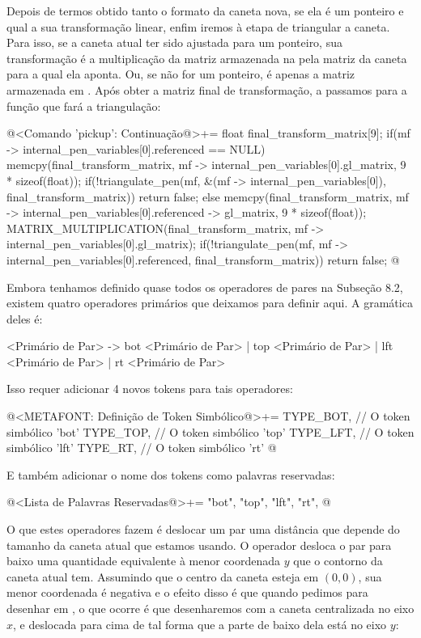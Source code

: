 {Depois de termos obtido tanto o formato da caneta nova, se ela é um
ponteiro e qual a sua transformação linear, enfim iremos à etapa de
triangular a caneta. Para isso, se a caneta atual ter sido ajustada
para um ponteiro, sua transformação é a multiplicação da matriz
armazenada na  pela matriz da caneta para a
qual ela aponta. Ou, se não for um ponteiro, é apenas a matriz
armazenada em . Após obter a matriz final de
transformação, a passamos para a função que fará a triangulação:

\iniciocodigo
@<Comando 'pickup': Continuação@>+=
{
  float final_transform_matrix[9];
  if(mf -> internal_pen_variables[0].referenced == NULL){
    memcpy(final_transform_matrix, mf -> internal_pen_variables[0].gl_matrix,
           9 * sizeof(float));
    if(!triangulate_pen(mf, &(mf -> internal_pen_variables[0]),
                        final_transform_matrix))
      return false;
  }
  else{
    memcpy(final_transform_matrix,
           mf -> internal_pen_variables[0].referenced -> gl_matrix,
           9 * sizeof(float));
    MATRIX_MULTIPLICATION(final_transform_matrix,
                          mf -> internal_pen_variables[0].gl_matrix);
    if(!triangulate_pen(mf, mf -> internal_pen_variables[0].referenced,
                        final_transform_matrix))
      return false;
  }
}
@
\fimcodigo


Embora tenhamos definido quase todos os operadores de pares na
Subseção 8.2, existem quatro operadores primários que deixamos para
definir aqui. A gramática deles é:

\alinhaverbatim
<Primário de Par> -> bot <Primário de Par> | top <Primário de Par> |
                     lft <Primário de Par> | rt <Primário de Par>
\alinhanormal

Isso requer adicionar 4 novos tokens para tais operadores:

\iniciocodigo
@<METAFONT: Definição de Token Simbólico@>+=
TYPE_BOT,  // O token simbólico 'bot'
TYPE_TOP,  // O token simbólico 'top'
TYPE_LFT,  // O token simbólico 'lft'
TYPE_RT,   // O token simbólico 'rt'
@
\fimcodigo

E também adicionar o nome dos tokens como palavras reservadas:

\iniciocodigo
@<Lista de Palavras Reservadas@>+=
"bot", "top", "lft", "rt",
@
\fimcodigo

O que estes operadores fazem é deslocar um par uma distância que
depende do tamanho da caneta atual que estamos usando. O
operador  desloca o par para baixo uma quantidade
equivalente à menor coordenada $y$ que o contorno da caneta atual
tem. Assumindo que o centro da caneta esteja em $(0, 0)$, sua menor
coordenada é negativa e o efeito disso é que quando pedimos para
desenhar em , o que ocorre é que desenharemos
com a caneta centralizada no eixo $x$, e deslocada para cima de tal
forma que a parte de baixo dela está no eixo $y$:

}
